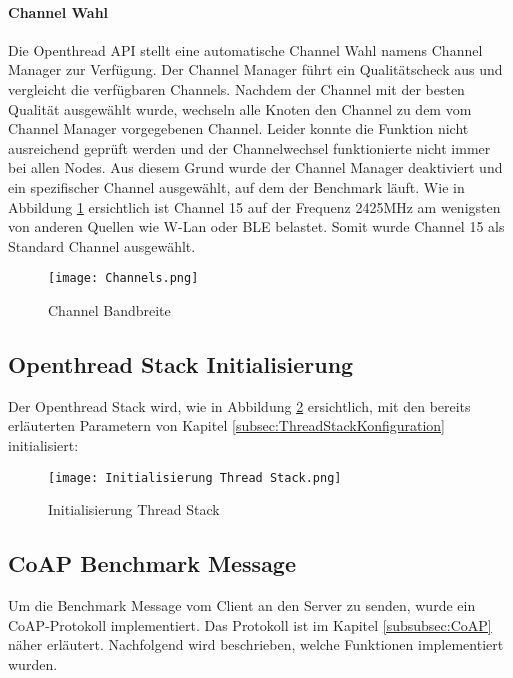 \newpage
\paragraph{Channel Wahl}
Die Openthread API stellt eine automatische Channel Wahl namens Channel Manager zur Verfügung. Der Channel Manager führt ein Qualitätscheck aus und vergleicht die verfügbaren Channels. Nachdem der Channel mit der besten Qualität ausgewählt wurde, wechseln alle Knoten den Channel zu dem vom Channel Manager vorgegebenen Channel. Leider konnte die Funktion nicht ausreichend geprüft werden und der Channelwechsel funktionierte nicht immer bei allen Nodes. Aus diesem Grund wurde der Channel Manager deaktiviert und ein spezifischer Channel ausgewählt, auf dem der Benchmark läuft. Wie in Abbildung \ref{fig:ChannelBandbreite} ersichtlich ist Channel 15 auf der Frequenz 2425MHz am wenigsten von anderen Quellen wie W-Lan oder BLE belastet. Somit wurde Channel 15 als Standard Channel ausgewählt.
\begin{figure}[H]
	\centering
	\texttt{[image: Channels.png]}
	\caption{Channel Bandbreite \cite{zand_fig_nodate}}\label{fig:ChannelBandbreite}
\end{figure}

\subsection{Openthread Stack Initialisierung}\label{subsec:OpenthreadStackInitialisierun}
Der Openthread Stack wird, wie in Abbildung \ref{fig:InitialisierungThreadStack} ersichtlich, mit den bereits erläuterten Parametern von Kapitel \ref{subsec:ThreadStackKonfiguration} initialisiert:

\begin{figure}[H]
	\centering
	\texttt{[image: Initialisierung Thread Stack.png]}
	\caption{Initialisierung Thread Stack}\label{fig:InitialisierungThreadStack}
\end{figure}

\newpage
\subsection{CoAP Benchmark Message}\label{subsec:ThreadBenchmarkMessage}
Um die Benchmark Message vom Client an den Server zu senden, wurde ein CoAP-Protokoll implementiert. Das Protokoll ist im Kapitel \ref{subsubsec:CoAP} näher erläutert. Nachfolgend wird beschrieben, welche Funktionen implementiert wurden.

